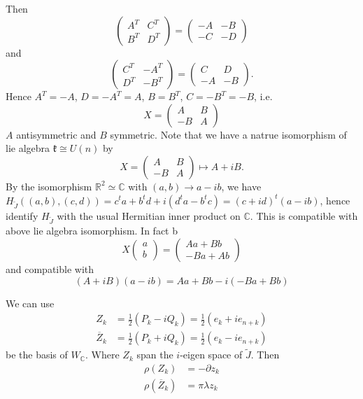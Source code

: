 \documentclass[12pt]{article}
\def\bR{{\mathbb{R}}}
\def\bC{{\mathbb{C}}}
\def\tJ{{\widetilde{J}}}
\def\barZ{{\overline{Z}}}
\def\fkk{\mathfrak{k}}
\def\pz#1{\partial z_{#1}}
\begin{document}
Then 
\[
\begin{pmatrix}
A^T & C^T \\
B^T & D^T 
\end{pmatrix} =
\begin{pmatrix}
-A & -B \\
-C & -D 
\end{pmatrix}
\]
and 
\[
\begin{pmatrix}
C^T & -A^T \\
D^T & -B^T 
\end{pmatrix} =
\begin{pmatrix}
C & D \\
-A & -B 
\end{pmatrix}.
\]
Hence $A^T = -A$, $D = -A^T= A$, $B = B^T$, $C = -B^T = -B$,
i.e. 
\[
X = \begin{pmatrix}
A & B\\
-B & A
\end{pmatrix}
\]
$A$ antisymmetric and $B$ symmetric.
Note that we have a natrue isomorphism of lie algebra
$\fkk \cong U(n)$ by 
\[
X = \begin{pmatrix}
A & B\\
-B & A
\end{pmatrix}
\mapsto
A + iB.
\]
By the isomorphism $\bR^2 \simeq \bC$ with $(a,b) \to a-ib$, 
we have $H_\tJ((a,b),(c,d)) = c^ta + b^td +i(d^t a- b^t c)
= (c+id)^t(a-ib)$, hence identify $H_\tJ$ with the usual Hermitian inner
product on $\bC$. This is compatible with above lie algebra isomorphism.
In fact
b\[
X\begin{pmatrix}a\\b
\end{pmatrix}
= \begin{pmatrix} Aa+Bb\\
-Ba+ Ab
\end{pmatrix} 
\]
and compatible with
\[
(A+iB)(a-ib) = Aa+Bb -i(-Ba+Bb)
\]

We can use 
\begin{align*}
Z_k  &= \frac{1}{2}(P_k-iQ_k) = \frac{1}{2}(e_k + i e_{n+k})\\
\barZ_k &= \frac{1}{2}(P_k+iQ_k) = \frac{1}{2}(e_k - i e_{n+k})
\end{align*}
be the basis of $W_{\bC}$. Where $Z_k$ span the $i$-eigen space of $\tJ$.
Then 
\begin{align*}
\rho(Z_k) &= -\pz{k} \\
\rho(\barZ_k) & = \pi\lambda z_k
\end{align*}
\end{document}
